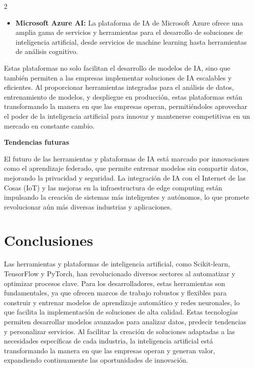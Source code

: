 \documentclass[12pt,spanish,Letterpaper,openany]{book}
\providecommand{\tightlist}{%
  \setlength{\itemsep}{0pt}\setlength{\parskip}{0pt}}
\begin{document}
\begin {multicols}{2}
\medskip
\medskip
\medskip

\begin{itemize}
\tightlist
\item
  \textbf{Microsoft Azure AI:} La plataforma de IA de Microsoft Azure ofrece una amplia gama de servicios y herramientas para el desarrollo de soluciones de inteligencia artificial, desde servicios de machine learning hasta herramientas de análisis cognitivo.
\end{itemize}

Estas plataformas no solo facilitan el desarrollo de modelos de IA, sino que también permiten a las empresas implementar soluciones de IA escalables y eficientes. Al proporcionar herramientas integradas para el análisis de datos, entrenamiento de modelos, y despliegue en producción, estas plataformas están transformando la manera en que las empresas operan, permitiéndoles aprovechar el poder de la inteligencia artificial para innovar y mantenerse
competitivas en un mercado en constante cambio.

\textbf{Tendencias futuras}

El futuro de las herramientas y plataformas de IA está marcado por innovaciones como el aprendizaje federado, que permite entrenar modelos sin compartir datos, mejorando la privacidad y seguridad. La integración de IA con el Internet de las Cosas (IoT) y las mejoras en la infraestructura de edge computing están impulsando la creación de sistemas más inteligentes y autónomos, lo que promete revolucionar aún más diversas industrias y aplicaciones.

\hypertarget{conclusiones-2}{%
\section{Conclusiones}\label{conclusiones-2}}

Las herramientas y plataformas de inteligencia artificial, como Scikit-learn, TensorFlow y PyTorch, han revolucionado diversos sectores al automatizar y optimizar procesos clave. Para los desarrolladores, estas herramientas son fundamentales, ya que ofrecen marcos de trabajo robustos y flexibles para construir y entrenar modelos de aprendizaje automático y redes neuronales, lo que facilita la implementación de soluciones de alta calidad. Estas tecnologías permiten desarrollar modelos avanzados para analizar datos, predecir tendencias y personalizar servicios. Al facilitar la creación de soluciones adaptadas a las necesidades específicas de cada industria, la inteligencia artificial está transformando la manera en que las empresas operan y generan valor, expandiendo continuamente las oportunidades de
innovación.


\end{multicols}
\end{document}
